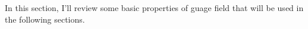 In this section, I'll review some basic properties of guage field
that will be used in the following sections.

